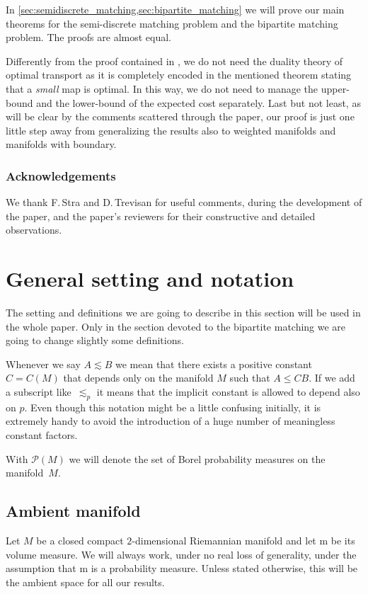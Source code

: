 \documentclass[JEP,XML,SOM,Unicode]{cedram}
\newcounter{results}[section]
\theoremstyle{plain}
\theoremstyle{definition}
\numberwithin{equation}{section}
\newcommand{\prob}{\ensuremath{\mathcal{P}}}
\newcommand{\m}{\ensuremath{\mathrm m}}
\begin{document}
In \cref{sec:semidiscrete_matching,sec:bipartite_matching} we will prove our main theorems for the
semi-discrete matching problem and the bipartite matching problem. The proofs are almost equal.

Differently from the proof contained in \cite{Ambrosio-Stra-Trevisan2018}, we do not need the duality theory
of optimal transport as it is completely encoded in the mentioned theorem stating that a \emph{small}
map is optimal.
In this way, we do not need to manage the upper-bound and the lower-bound of the expected cost separately.
Last but not least, as will be clear by the comments scattered through the paper, our proof is just one little step away from generalizing the results
also to weighted manifolds and manifolds with boundary.

\subsubsection*{Acknowledgements}
We thank F.\,Stra and D.\,Trevisan for useful comments, during the development of the paper, and the paper's reviewers
for their constructive and detailed observations.

\section{General setting and notation}
The setting and definitions we are going to describe in this section will be used in the whole paper.
Only in the section devoted to the bipartite matching we are going to change slightly some definitions.

Whenever we say $A\lesssim B$ we mean that there exists a positive constant $C=C(M)$ that
depends only on the manifold $M$ such that $A\le CB$. If we add a subscript like~$\lesssim_p$ it
means that the implicit constant is allowed to depend also on $p$.
Even though this notation might be a little confusing initially,
it is extremely handy to avoid the introduction of a huge number of meaningless constant factors.

With $\prob(M)$ we will denote the set of Borel probability measures on the manifold~$M$.

\subsection{Ambient manifold}\label{sub:setting}
Let $M$ be a closed compact $2$-dimensional Riemannian manifold and let $\m$ be its volume measure. We
will always work, under no real loss of generality, under the assumption that $\m$ is a probability measure.
Unless stated otherwise, this will be the ambient space for all our results.
\end{document}
